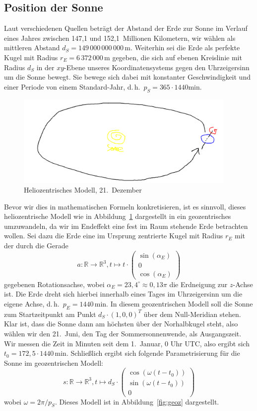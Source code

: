 \documentclass[
    paper=a4,
    DIV14,
    fontsize=12pt,
    pagesize=pdftex,
    toc=bibliographynumbered
]{scrartcl}
\numberwithin{figure}{section}
\numberwithin{equation}{section}
\numberwithin{table}{section}
\newcommand*\setR{\mathds{R}}
\newcommand*\vecd[3]{\begin{pmatrix} #1 \\ #2 \\ #3 \end{pmatrix}}
\begin{document}
\subsection{Position der Sonne}

Laut verschiedenen Quellen beträgt der Abstand der Erde zur Sonne im Verlauf eines Jahres
zwischen 147{,}1 und 152{,}1~Millionen Kilometern, wir wählen als mittleren Abstand $d_S =
149\,000\,000\,000\,\mathrm m$. Weiterhin sei die Erde als perfekte Kugel mit Radius $r_E
= 6\,372\,000\,\mathrm m$ gegeben, die sich auf ebenen Kreislinie mit Radius $d_S$ in der
$xy$-Ebene unseres Koordinatensystems gegen den Uhrzeigersinn um die Sonne bewegt. Sie
bewege sich dabei mit konstanter Geschwindigkeit und einer Periode von einem
Standard-Jahr, d.\,h.\ $p_S = 365\cdot 1440 \mathrm{min}$.

\begin{figure}[htb]
    \centering
    \includegraphics[width=0.95\textwidth]{images/tmp/helioz.png}
    \caption{Heliozentrisches Modell, 21.\ Dezember}
    \label{fig:helioz}
\end{figure}

Bevor wir dies in mathematischen Formeln konkretisieren, ist es sinnvoll, dieses
heliozentrische Modell wie in Abbildung~\ref{fig:helioz} dargestellt in ein geozentrisches
umzuwandeln, da wir im Endeffekt eine fest im Raum stehende Erde betrachten wollen. Sei
dazu die Erde eine im Ursprung zentrierte Kugel mit Radius $r_E$ mit der durch die Gerade
\begin{equation*}
    a : \setR \to \setR^3, t \mapsto t\cdot \vecd{\sin(\alpha_E)}0{\cos(\alpha_E)}
\end{equation*}
gegebenen Rotationsachse, wobei $\alpha_E = 23{,}4^\circ \approx 0{,}13\pi$ die Erdneigung
zur $z$-Achse ist. Die Erde dreht sich hierbei innerhalb eines Tages im Uhrzeigersinn um
die eigene Achse, d.\,h.\ $p_E=1440\,\mathrm{min}$. In diesem geozentrischen Modell soll
die Sonne zum Startzeitpunkt am Punkt $d_S \cdot (1, 0, 0)^T$ über dem Null-Meridian
stehen. Klar ist, dass die Sonne dann am höchsten über der Norhalbkugel steht, also wählen
wir den 21.\ Juni, den Tag der Sommersonnenwende, als Ausgangszeit. Wir messen die Zeit in
Minuten seit dem 1.\ Januar, 0 Uhr UTC, also ergibt sich $t_0=172{,}5 \cdot 1440
\,\mathrm{min}$. Schließlich ergibt sich folgende Parametrisierung für die Sonne im
geozentrischen Modell:
\begin{equation*}
    s: \setR \to \setR^3, t\mapsto d_S \cdot
        \vecd{\cos( \omega(t - t_0) )}{\sin( \omega(t - t_0) )}0
\end{equation*}
wobei $\omega = 2\pi/p_S$. Dieses Modell ist in Abbildung~\ref{fig:geoz} dargestellt.
\end{document}
